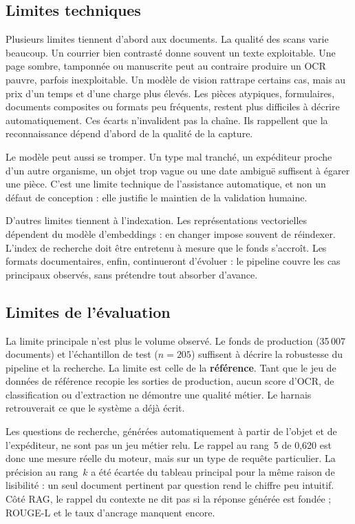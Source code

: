 \subsection{Limites techniques}

Plusieurs limites tiennent d'abord aux documents. La qualité des scans varie beaucoup. Un courrier bien contrasté donne souvent un texte exploitable. Une page sombre, tamponnée ou manuscrite peut au contraire produire un OCR pauvre, parfois inexploitable. Un modèle de vision rattrape certains cas, mais au prix d'un temps et d'une charge plus élevés. Les pièces atypiques, formulaires, documents composites ou formats peu fréquents, restent plus difficiles à décrire automatiquement. Ces écarts n'invalident pas la chaîne. Ils rappellent que la reconnaissance dépend d'abord de la qualité de la capture.

Le modèle peut aussi se tromper. Un type mal tranché, un expéditeur proche d'un autre organisme, un objet trop vague ou une date ambiguë suffisent à égarer une pièce. C'est une limite technique de l'assistance automatique, et non un défaut de conception : elle justifie le maintien de la validation humaine.

D'autres limites tiennent à l'indexation. Les représentations vectorielles dépendent du modèle d'embeddings : en changer impose souvent de réindexer. L'index de recherche doit être entretenu à mesure que le fonds s'accroît. Les formats documentaires, enfin, continueront d'évoluer : le pipeline couvre les cas principaux observés, sans prétendre tout absorber d'avance.

\subsection{Limites de l'évaluation}

La limite principale n'est plus le volume observé. Le fonds de production (35\,007 documents) et l'échantillon de test ($n = 205$) suffisent à décrire la robustesse du pipeline et la recherche. La limite est celle de la \textbf{référence}. Tant que le jeu de données de référence recopie les sorties de production, aucun score d'OCR, de classification ou d'extraction ne démontre une qualité métier. Le harnais retrouverait ce que le système a déjà écrit.

Les questions de recherche, générées automatiquement à partir de l'objet et de l'expéditeur, ne sont pas un jeu métier relu. Le rappel au rang~5 de 0,620 est donc une mesure réelle du moteur, mais sur un type de requête particulier. La précision au rang~$k$ a été écartée du tableau principal pour la même raison de lisibilité : un seul document pertinent par question rend le chiffre peu intuitif. Côté RAG, le rappel du contexte ne dit pas si la réponse générée est fondée ; ROUGE-L et le taux d'ancrage manquent encore.

